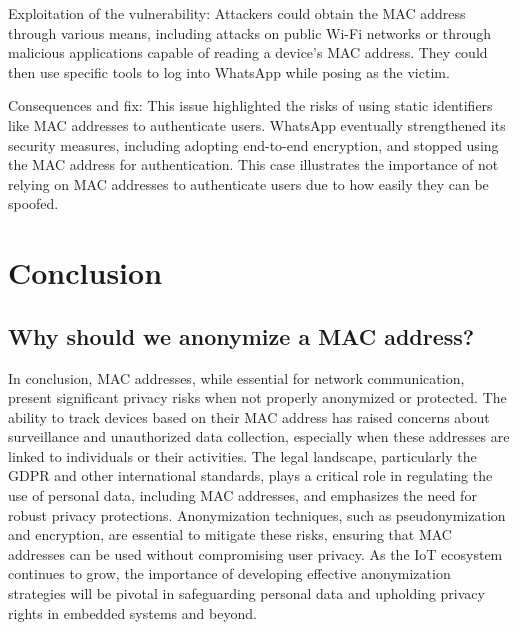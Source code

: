 \documentclass{article}
\begin{document}
Exploitation of the vulnerability:
Attackers could obtain the MAC address through various means, including attacks on public Wi-Fi networks
or through malicious applications capable of reading a device's MAC address. They could then use specific tools
to log into WhatsApp while posing as the victim.

Consequences and fix:
This issue highlighted the risks of using static identifiers like MAC addresses to authenticate users.
WhatsApp eventually strengthened its security measures, including adopting end-to-end encryption, 
and stopped using the MAC address for authentication. This case illustrates the importance 
of not relying on MAC addresses to authenticate users due to how easily they can be spoofed.






\section{\label{sec:Conclusion}Conclusion}
  \subsection{\label{sec:Why}Why should we anonymize a MAC address?}
In conclusion, MAC addresses, while essential for network communication, present 
significant privacy risks when not properly anonymized or protected. The ability 
to track devices based on their MAC address has raised concerns about surveillance 
and unauthorized data collection, especially when these addresses are linked to 
individuals or their activities. The legal landscape, particularly the GDPR and 
other international standards, plays a critical role in regulating the use of 
personal data, including MAC addresses, and emphasizes the need for robust privacy 
protections. Anonymization techniques, such as pseudonymization and encryption, 
are essential to mitigate these risks, ensuring that MAC addresses can be used 
without compromising user privacy. As the IoT ecosystem continues to grow, the 
importance of developing effective anonymization strategies will be pivotal in 
safeguarding personal data and upholding privacy rights in embedded systems and 
beyond.
\newpage


\end{document}
